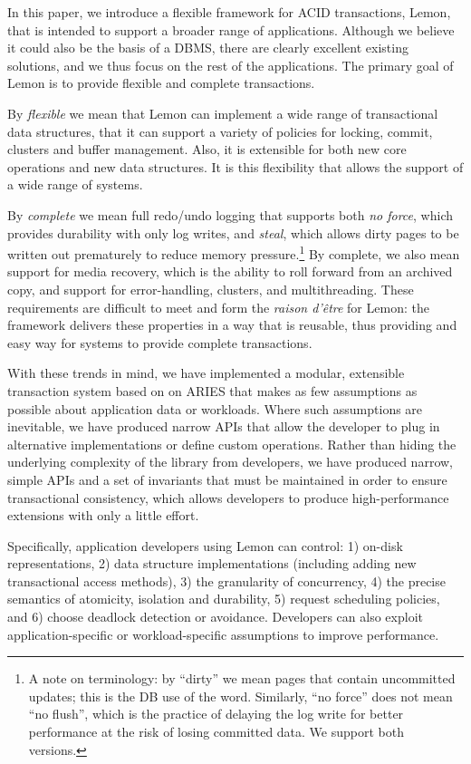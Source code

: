 \documentclass[10pt,letterpaper,twocolumn,english]{article}
\newcommand{\yad}{Lemon\xspace}
\begin{document}
In this paper, we introduce a flexible framework for ACID
transactions, \yad, that is intended to support a broader range of
applications.  Although we believe it could also be the basis of a
DBMS, there are clearly excellent existing solutions, and we thus
focus on the rest of the applications.  The primary goal of \yad is to
provide flexible and complete transactions.

By {\em flexible} we mean that \yad can implement a wide range of
transactional data structures, that it can support a variety of
policies for locking, commit, clusters and buffer management. Also,
it is extensible for both new core operations and new data
structures.  It is this flexibility that allows the support of a wide
range of systems.

By {\em complete} we mean full redo/undo logging that supports both
{\em no force}, which provides durability with only log writes, and
{\em steal}, which allows dirty pages to be written out prematurely to
reduce memory pressure.\footnote{A note on terminology: by ``dirty''
we mean pages that contain uncommitted updates; this is the DB use of
the word. Similarly, ``no force'' does not mean ``no flush'', which is
the practice of delaying the log write for better performance at the
risk of losing committed data. We support both versions.} By complete,
we also mean support for media recovery, which is the ability to roll
forward from an archived copy, and support for error-handling,
clusters, and multithreading.  These requirements are difficult to
meet and form the {\em raison d'\^{e}tre} for \yad: the framework delivers
these properties in a way that is reusable, thus providing and easy
way for systems to provide complete transactions.

With these trends in mind, we have implemented a modular, extensible
transaction system based on on ARIES that makes as few assumptions as
possible about application data or workloads. Where such
assumptions are inevitable, we have produced narrow APIs that allow
the developer to plug in alternative implementations or
define custom operations. Rather than hiding the underlying complexity
of the library from developers, we have produced narrow, simple APIs
and a set of invariants that must be maintained in order to ensure
transactional consistency, which allows developers to produce
high-performance extensions with only a little effort.  

Specifically, application developers using \yad can control: 1)
on-disk representations, 2) data structure implementations (including
adding new transactional access methods), 3) the granularity of
concurrency, 4) the precise semantics of atomicity, isolation and
durability, 5) request scheduling policies, and 6) choose deadlock detection or avoidance.  Developers
can also exploit application-specific or workload-specific assumptions
to improve performance.
\end{document}

